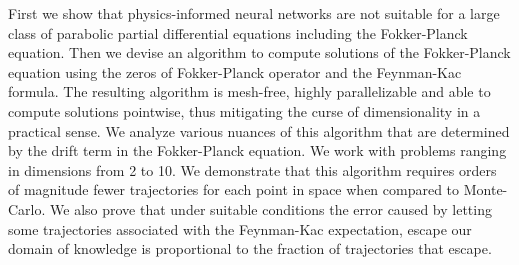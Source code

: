 
First we show that physics-informed neural networks are not suitable for a large class of parabolic partial differential equations including the Fokker-Planck equation. Then we devise an algorithm to compute solutions of the Fokker-Planck equation using the zeros of Fokker-Planck operator and the Feynman-Kac formula. The resulting algorithm is mesh-free, highly parallelizable and able to compute solutions pointwise, thus mitigating the curse of dimensionality in a practical sense. We analyze various nuances of this algorithm that are determined by the drift term in the Fokker-Planck equation. We work with problems ranging in dimensions from 2 to 10. We demonstrate that this algorithm requires orders of magnitude fewer trajectories for each point in space when compared to Monte-Carlo. We also prove that under suitable conditions the error caused by letting some trajectories associated with the Feynman-Kac expectation, escape our domain of knowledge is proportional to the fraction of trajectories that escape.
